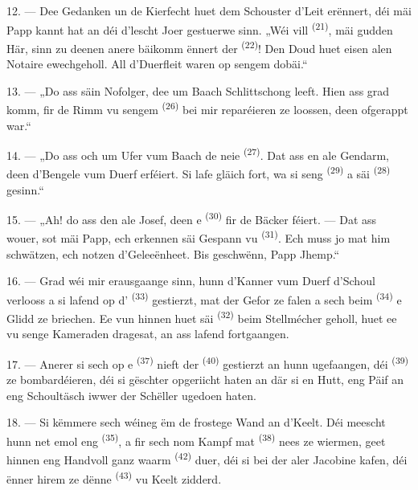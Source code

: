 12. --- Dee Gedanken un de Kierfecht huet dem Schouster d'Leit erënnert, déi mäi
Papp kannt hat an déi d'lescht Joer gestuerwe sinn. „Wéi vill 
\textsuperscript{(21)}, mäi gudden Här, sinn zu deenen anere bäikomm ënnert der
 \textsuperscript{(22)}! Den Doud huet eisen alen Notaire ewechgeholl.
All d'Duerfleit waren op sengem  dobäi.“

13. --- „Do ass säin Nofolger, dee um Baach Schlittschong leeft. Hien ass grad komm,
fir de Rimm vu sengem  \textsuperscript{(26)} bei mir
reparéieren ze loossen, deen ofgerappt war.“

14. --- „Do ass och um Ufer vum Baach de neie 
\textsuperscript{(27)}. Dat ass en ale Gendarm, deen d'Bengele vum Duerf erféiert. Si
lafe gläich fort, wa si seng  \textsuperscript{(29)} a säi
 \textsuperscript{(28)} gesinn.“

15. --- „Ah! do ass den ale Josef, deen e 
\textsuperscript{(30)} fir de Bäcker féiert. --- Dat ass wouer, sot mäi Papp, ech
erkennen säi Gespann vu  \textsuperscript{(31)}. Ech muss jo mat him
schwätzen, ech notzen d'Geleeënheet. Bis geschwënn, Papp Jhemp.“

16. --- Grad wéi mir erausgaange sinn, hunn d'Kanner vum Duerf d'Schoul verlooss a
si lafend op d' \textsuperscript{(33)} gestierzt, mat der Gefor ze
falen a sech beim  \textsuperscript{(34)} e Glidd ze briechen. Ee vun
hinnen huet säi  \textsuperscript{(32)} beim Stellmécher geholl, huet
ee vu senge Kameraden dragesat, an ass lafend fortgaangen.

17. --- Anerer si sech op e  \textsuperscript{(37)} nieft der
 \textsuperscript{(40)} gestierzt an hunn ugefaangen, déi
 \textsuperscript{(39)} ze bombardéieren, déi si gëschter opgeriicht
haten an där si en Hutt, eng Päif an eng Schoultäsch iwwer der Schëller ugedoen haten.

18. --- Si këmmere sech wéineg ëm de frostege Wand an d'Keelt. Déi meescht hunn net
emol eng  \textsuperscript{(35)}, a fir sech nom Kampf mat
 \textsuperscript{(38)} nees ze wiermen, geet hinnen eng Handvoll
ganz waarm  \textsuperscript{(42)} duer, déi si bei der aler
 Jacobine kafen, déi ënner hirem ze dënne 
\textsuperscript{(43)} vu Keelt zidderd.

